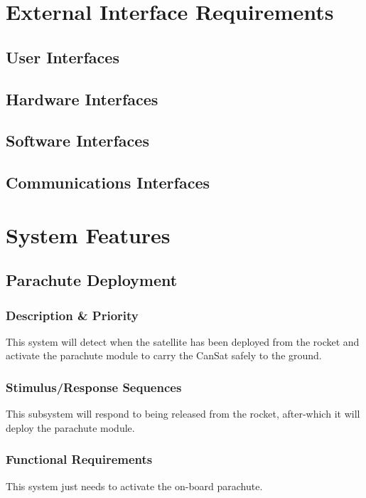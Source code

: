 \documentclass[10pt,onecolumn,draftclsnofoot,document]{IEEEtran}
\begin{document}
\section{External Interface Requirements}


\subsection{User Interfaces}


\subsection{Hardware Interfaces}


\subsection{Software Interfaces}


\subsection{Communications Interfaces}



\section{System Features}
\subsection{Parachute Deployment}
\subsubsection{Description \& Priority}
This system will detect when the satellite has been deployed from the rocket and activate the parachute module to carry the CanSat safely to the ground.

\subsubsection{Stimulus/Response Sequences}
This  subsystem will respond to being released from the rocket, after-which it will deploy the parachute module.

\subsubsection{Functional Requirements}
This system just needs to activate the on-board parachute.
\end{document}
